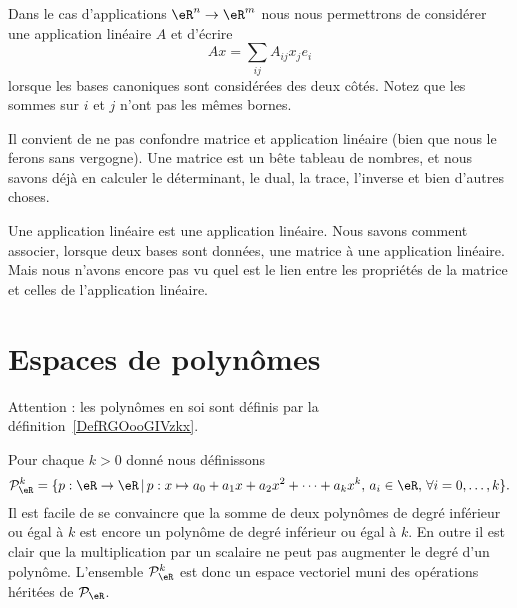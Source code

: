 \begin{normaltext}      \label{NORMALooHNPMooFvFYCC}
    Dans le cas d'applications \( \eR^n\to \eR^m\) nous nous permettrons de considérer une application linéaire \( A\) et d'écrire
    \begin{equation}
        Ax=\sum_{ij}A_{ij}x_je_i
    \end{equation}
    lorsque les bases canoniques sont considérées des deux côtés. Notez que les sommes sur \( i\) et \( j\) n'ont pas les mêmes bornes.
\end{normaltext}

\begin{normaltext}
    Il convient de ne pas confondre matrice et application linéaire (bien que nous le ferons sans vergogne). Une matrice est un bête tableau de nombres, et nous savons déjà en calculer le déterminant, le dual, la trace, l'inverse et bien d'autres choses.

    Une application linéaire est une application linéaire. Nous savons comment associer, lorsque deux bases sont données, une matrice à une application linéaire. Mais nous n'avons encore pas vu quel est le lien entre les propriétés de la matrice et celles de l'application linéaire.
\end{normaltext}

\section{Espaces de polynômes}
\label{SecEspacePolynomes}

Attention : les polynômes en soi sont définis par la définition~\ref{DefRGOooGIVzkx}.

Pour chaque $k>0$ donné nous définissons
\begin{equation}
\mathcal{P}_\eR^k=\{p:\eR\to \eR\,|\, p : x\mapsto a_0+a_1 x +a_2 x^2 + \cdots+a_k x^k, \, a_i\in\eR,\,\forall i=0,\ldots,k\}.
\end{equation}
Il est facile de se convaincre que la somme de deux polynômes de degré inférieur ou égal à $k$ est encore un polynôme de degré inférieur ou égal à $k$. En outre il est clair que la multiplication par un scalaire ne peut pas augmenter le degré d'un polynôme. L'ensemble $\mathcal{P}_\eR^k$ est donc un espace vectoriel muni des opérations héritées de $\mathcal{P}_{\eR}$.

